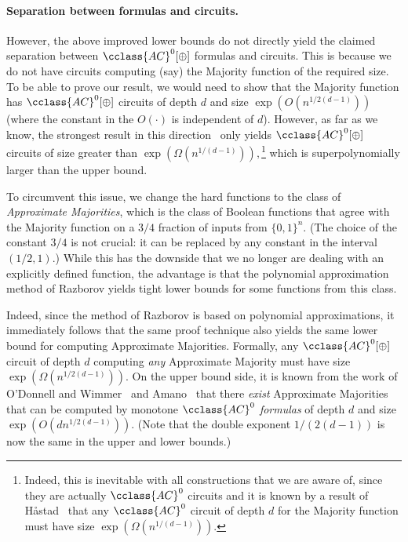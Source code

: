 \documentclass{toc}
\newcommand{\AC}{\cclass{AC}}
\begin{document}
\paragraph{Separation between formulas and circuits.} However, the above improved lower bounds do not directly yield the claimed separation between $\AC^0[\oplus]$ formulas and circuits. This is because we do not have circuits computing (say) the Majority function of the required size. To be able to prove our result, we would need to show that the Majority function has $\AC^0[\oplus]$ circuits of depth $d$ and size $\exp(O(n^{1/2(d-1)}))$ (where the constant in the $O(\cdot)$ is independent of $d$). However, as far as we know, the strongest result in this direction~\cite{KPPY84majubd} only yields $\AC^0[\oplus]$ circuits of size greater than 
$\exp(\Omega(n^{1/(d-1)})),$\footnote{Indeed, this is inevitable with all constructions that we are aware of, since they are actually $\AC^0$ circuits and it is known by a result of H\r{a}stad~\cite{Hastad} that any $\AC^0$ circuit of depth $d$ for the Majority function must have size $\exp(\Omega(n^{1/(d-1)}))$.} which is superpolynomially larger than the upper bound.

To circumvent this issue, we change the hard functions to the class of \emph{Approximate Majorities}, which is the class of Boolean functions that agree with
the  %
%
%
%
Majority function on a $3/4$ fraction of inputs from $\{0,1\}^n$. (The choice of the constant $3/4$ is not crucial: it can be replaced by any constant in the interval $(1/2,1)$.)
%
While this has the downside that we no longer are dealing with an explicitly defined function, the advantage is that the polynomial approximation method of Razborov yields tight lower bounds for some functions from this class. 

Indeed, since the method of Razborov is based on polynomial approximations, it immediately follows that the same proof technique also yields the same lower bound for computing Approximate Majorities. Formally, any $\AC^0[\oplus]$ circuit of depth $d$ computing \emph{any} Approximate Majority must have size $\exp(\Omega(n^{1/2(d-1)}))$. On the upper bound side, it is known from the work of O'Donnell and Wimmer~\cite{odonnellwimmer} and Amano~\cite{Amano-appxmaj} that there \emph{exist} Approximate Majorities that can be computed by monotone $\AC^0$ \emph{formulas} of depth $d$ and size $\exp(O(dn^{1/2(d-1)}))$. (Note that the double exponent ${1}/{(2(d-1))}$ is now the same in the upper and lower bounds.)
\end{document}
